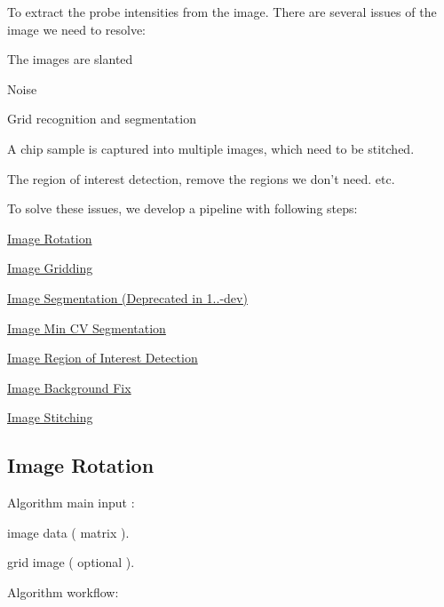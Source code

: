 To extract the probe intensities from the image. There are several issues of the image we need to resolve\-:
\begin{DoxyEnumerate}
\item The images are slanted
\item Noise
\item Grid recognition and segmentation
\item A chip sample is captured into multiple images, which need to be stitched.
\item The region of interest detection, remove the regions we don't need. etc.
\end{DoxyEnumerate}

To solve these issues, we develop a pipeline with following steps\-:
\begin{DoxyItemize}
\item \hyperlink{improc_image_rotation}{Image Rotation}
\item \hyperlink{improc_gridding}{Image Gridding}
\item \hyperlink{improc_segmentation}{Image Segmentation (Deprecated in 1..-\/dev)}
\item \hyperlink{improc_min_cv_auto_margin}{Image Min C\-V Segmentation}
\item \hyperlink{improc_r_o_i_detection}{Image Region of Interest Detection}
\item \hyperlink{improc_background_fix_sub_and_division01}{Image Background Fix}
\item \hyperlink{improc_stitiching}{Image Stitching} 
\end{DoxyItemize}\hypertarget{improc_image_rotation}{}\subsection{Image Rotation}\label{improc_image_rotation}
Algorithm main input \-: \par

\begin{DoxyItemize}
\item image data ( matrix ).
\item grid image ( optional ). \par

\end{DoxyItemize}

Algorithm workflow\-: \par

